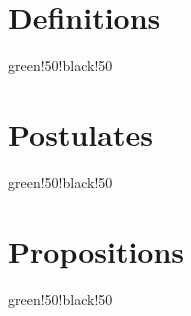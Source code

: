 \documentclass{book}
\begin{document}


%
%
\listoffigures

\chapter{Definitions}{green!50!black!50}

























\chapter{Postulates}{green!50!black!50}







\chapter{Propositions}{green!50!black!50}
\end{document}
